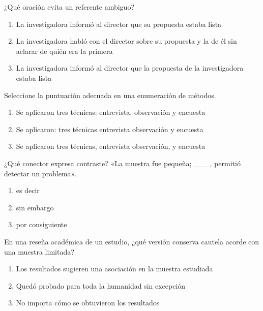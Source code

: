 \noindent\begin{minipage}{\linewidth}\setlength{\parskip}{4pt}\label{q:E-006}
¿Qué oración evita un referente ambiguo?
\begin{enumerate}[label=\Alph*),nosep]
\item La investigadora informó al director que su propuesta estaba lista
\item La investigadora habló con el director sobre su propuesta y la de él sin aclarar de quién era la primera
\item La investigadora informó al director que la propuesta de la investigadora estaba lista
\end{enumerate}\end{minipage}\par\medskip

\noindent\begin{minipage}{\linewidth}\setlength{\parskip}{4pt}\label{q:E-007}
Seleccione la puntuación adecuada en una enumeración de métodos.
\begin{enumerate}[label=\Alph*),nosep]
\item Se aplicaron tres técnicas: entrevista, observación y encuesta
\item Se aplicaron: tres técnicas entrevista observación y encuesta
\item Se aplicaron tres técnicas, entrevista observación, y encuesta
\end{enumerate}\end{minipage}\par\medskip

\noindent\begin{minipage}{\linewidth}\setlength{\parskip}{4pt}\label{q:E-008}
¿Qué conector expresa contraste? «La muestra fue pequeña; \_\_\_, permitió detectar un problema».
\begin{enumerate}[label=\Alph*),nosep]
\item es decir
\item sin embargo
\item por consiguiente
\end{enumerate}\end{minipage}\par\medskip

\noindent\begin{minipage}{\linewidth}\setlength{\parskip}{4pt}\label{q:E-009}
En una reseña académica de un estudio, ¿qué versión conserva cautela acorde con una muestra limitada?
\begin{enumerate}[label=\Alph*),nosep]
\item Los resultados sugieren una asociación en la muestra estudiada
\item Quedó probado para toda la humanidad sin excepción
\item No importa cómo se obtuvieron los resultados
\end{enumerate}\end{minipage}\par\medskip

